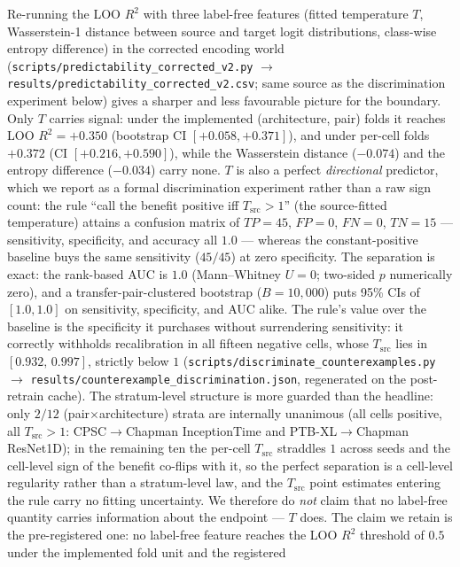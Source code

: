 \documentclass[final,5p,times,nonatbib]{elsarticle}
\begin{document}
Re-running the LOO
$R^2$ with three label-free features (fitted temperature $T$,
Wasserstein-1 distance between source and target logit distributions,
class-wise entropy difference) in the corrected encoding world
(\texttt{scripts/predictability\_corrected\_v2.py} $\rightarrow$
\texttt{results/predictability\_corrected\_v2.csv}; same source as the
discrimination experiment below) gives a sharper and less favourable
picture for the boundary. Only $T$ carries signal: under the
implemented (architecture, pair) folds it reaches LOO $R^2 = +0.350$
(bootstrap CI $[+0.058, +0.371]$), and under per-cell folds $+0.372$
(CI $[+0.216, +0.590]$), while the Wasserstein distance ($-0.074$) and
the entropy difference ($-0.034$) carry none. $T$ is also a perfect
\emph{directional} predictor, which we report as a formal
discrimination experiment rather than a raw sign count: the rule
``call the benefit positive iff $T_{\text{src}}>1$'' (the
source-fitted temperature) attains a confusion matrix of
$TP{=}45$, $FP{=}0$, $FN{=}0$, $TN{=}15$ --- sensitivity, specificity,
and accuracy all $1.0$ --- whereas the constant-positive baseline buys
the same sensitivity ($45/45$) at zero specificity. The separation is
exact: the rank-based AUC is $1.0$ (Mann--Whitney $U=0$; two-sided $p$
numerically zero), and a transfer-pair-clustered bootstrap
($B=10{,}000$) puts 95\% CIs of $[1.0,1.0]$ on sensitivity,
specificity, and AUC alike. The rule's value over the baseline is the
specificity it purchases without surrendering sensitivity: it
correctly withholds recalibration in all fifteen negative cells, whose
$T_{\text{src}}$ lies in $[0.932,\,0.997]$, strictly below $1$
(\texttt{scripts/discriminate\_counterexamples.py} $\rightarrow$
\texttt{results/counterexample\_discrimination.json}, regenerated on
the post-retrain cache). The
stratum-level structure is more guarded than the headline: only $2/12$
(pair$\times$architecture) strata are internally unanimous (all cells
positive, all $T_{\text{src}}>1$: CPSC$\rightarrow$Chapman
InceptionTime and PTB-XL$\rightarrow$Chapman ResNet1D); in the
remaining ten the per-cell
$T_{\text{src}}$ straddles $1$ across seeds and the cell-level sign of
the benefit co-flips with it, so the perfect separation is a
cell-level regularity rather than a stratum-level law, and the
$T_{\text{src}}$ point estimates entering the rule carry no fitting
uncertainty.
We therefore do \emph{not} claim that no label-free quantity carries
information about the endpoint --- $T$ does. The claim we retain is the
pre-registered one: no label-free feature reaches the LOO $R^2$
threshold of $0.5$ under the implemented fold unit and the registered
\end{document}
